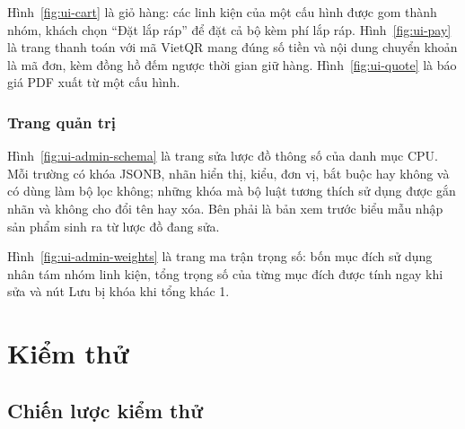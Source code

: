 

Hình~\ref{fig:ui-cart} là giỏ hàng: các linh kiện của một cấu hình được gom thành nhóm, khách chọn ``Đặt lắp ráp'' để đặt cả bộ kèm phí lắp ráp. Hình~\ref{fig:ui-pay} là trang thanh toán với mã VietQR mang đúng số tiền và nội dung chuyển khoản là mã đơn, kèm đồng hồ đếm ngược thời gian giữ hàng. Hình~\ref{fig:ui-quote} là báo giá PDF xuất từ một cấu hình.


\subsubsection{Trang quản trị}



Hình~\ref{fig:ui-admin-schema} là trang sửa lược đồ thông số của danh mục CPU. Mỗi trường có khóa JSONB, nhãn hiển thị, kiểu, đơn vị, bắt buộc hay không và có dùng làm bộ lọc không; những khóa mà bộ luật tương thích sử dụng được gắn nhãn và không cho đổi tên hay xóa. Bên phải là bản xem trước biểu mẫu nhập sản phẩm sinh ra từ lược đồ đang sửa.


Hình~\ref{fig:ui-admin-weights} là trang ma trận trọng số: bốn mục đích sử dụng nhân tám nhóm linh kiện, tổng trọng số của từng mục đích được tính ngay khi sửa và nút Lưu bị khóa khi tổng khác 1.

\section{Kiểm thử}
\label{sec:kiem-thu}

\subsection{Chiến lược kiểm thử}

